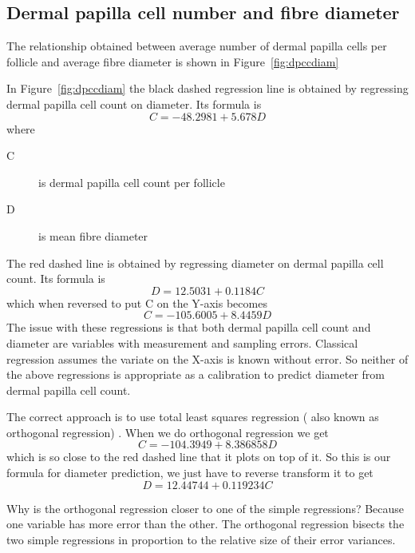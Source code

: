 \documentclass[titlepage]{article}  %
\begin{document}
\subsection{ Dermal papilla cell number and fibre diameter}
 The relationship obtained between average number of dermal papilla cells per follicle and average fibre diameter is shown in Figure~\ref{fig:dpccdiam}

In Figure~\ref{fig:dpccdiam} the black dashed regression line is obtained by regressing dermal papilla cell count on diameter. Its formula is
\begin{displaymath}
C = -48.2981 + 5.678 D
\end{displaymath}
where
\begin{description}
\item[C] is dermal papilla cell count per follicle
\item[D] is mean fibre diameter
\end{description}
The red dashed line is obtained by regressing diameter on dermal papilla cell count. Its formula is
\begin{displaymath}
D = 12.5031 + 0.1184 C
\end{displaymath}
which when reversed to put C on the Y-axis becomes
\begin{displaymath}
C = -105.6005 + 8.4459 D
\end{displaymath}
The issue with these regressions is that both dermal papilla cell count and diameter are variables with measurement and sampling errors. Classical regression assumes the variate on the X-axis is known without error. So neither of the above regressions is appropriate as a calibration to predict diameter from dermal papilla cell count. 

The correct approach is to use total least squares regression ( also known as orthogonal regression) . When we do orthogonal regression we get 
\begin{displaymath}
C = -104.3949 + 8.386858 D
\end{displaymath}
which is so close to the red dashed line that it plots on top of it. 
So this is our formula for diameter prediction, we just have to reverse transform it to get 
\begin{displaymath}
D = 12.44744 + 0.119234 C 
\end{displaymath}


Why is the orthogonal regression closer to one of the simple regressions?  Because one variable has more error than the other.  The orthogonal regression bisects the two simple regressions in proportion to the relative size of their error variances.
\end{document}
